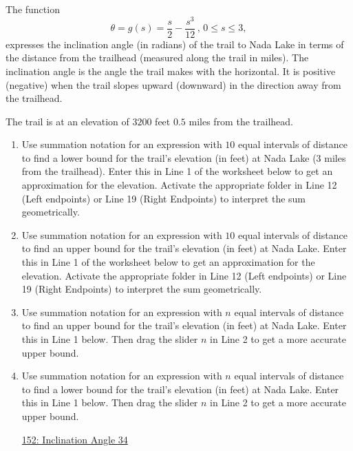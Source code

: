 \documentclass{ximera}
\begin{document}
\begin{question}  \label{QIIIUER3355}
The function
\[
      \theta = g(s) = \frac{s}{2} - \frac{s^3}{12} \, , \, 0\leq s \leq 3 , 
\]
expresses the inclination angle (in radians) of the trail to Nada Lake in terms of the distance from the trailhead (measured along the trail in miles). The inclination angle is the angle the trail makes with the horizontal. It is positive (negative) when the trail slopes upward (downward) in the direction away from the trailhead.

The trail is at an elevation of $3200$ feet $0.5$ miles from the trailhead.

\begin{enumerate}
\item Use summation notation for an expression with $10$ equal intervals of distance to find a lower bound for the trail's elevation (in feet) at Nada Lake (3 miles from the trailhead). Enter this in Line 1 of the worksheet below to get an approximation for the elevation. Activate the appropriate folder in Line 12 (Left endpoints) or Line 19 (Right Endpoints) to interpret the sum geometrically.

\item Use summation notation for an expression with $10$ equal intervals of distance to find an upper bound for the trail's elevation (in feet) at Nada Lake. Enter this in Line 1 of the worksheet below to get an approximation for the elevation. Activate the appropriate folder in Line 12 (Left endpoints) or Line 19 (Right Endpoints) to interpret the sum geometrically.


\item  Use summation notation for an expression with $n$ equal intervals of distance to find an upper bound for the trail's elevation (in feet) at Nada Lake. Enter this in Line 1 below. Then drag the slider $n$ in Line 2 to get a more accurate upper bound.

\item Use summation notation for an expression with $n$ equal intervals of distance to find a lower bound for the trail's elevation (in feet) at Nada Lake. Enter this in Line 1 below. Then drag the slider $n$ in Line 2 to get a more accurate upper bound.

\begin{onlineOnly}
    \begin{center}
\end{center}
\end{onlineOnly}
 
\href{https://www.desmos.com/calculator/qhyco8cuou}{152: Inclination Angle 34}

\end{enumerate}
\end{question}
\end{document}
